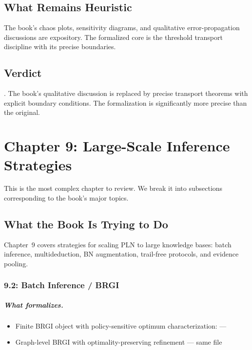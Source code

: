 \documentclass[11pt,openany]{report}
\begin{document}
\section{What Remains Heuristic}

The book's chaos plots, sensitivity diagrams, and qualitative
error-propagation discussions are expository.  The formalized core is
the threshold transport discipline with its precise boundaries.

\section{Verdict}

\verdictCorrected{}.  The book's qualitative discussion is replaced by
precise transport theorems with explicit boundary conditions.  The
formalization is significantly more precise than the original.


\chapter{Chapter 9: Large-Scale Inference Strategies}
\label{ch:review-ch9}

This is the most complex chapter to review.  We break it into subsections
corresponding to the book's major topics.

\section{What the Book Is Trying to Do}

Chapter~9 covers strategies for scaling PLN to large knowledge bases:
batch inference, multideduction, BN augmentation, trail-free protocols,
and evidence pooling.

\subsection{9.2: Batch Inference / BRGI}

\paragraph{What formalizes.}
\begin{itemize}
\item Finite BRGI object with policy-sensitive optimum characterization:
   ---
\item Graph-level BRGI with optimality-preserving refinement ---
  same file
\end{itemize}
\end{document}
